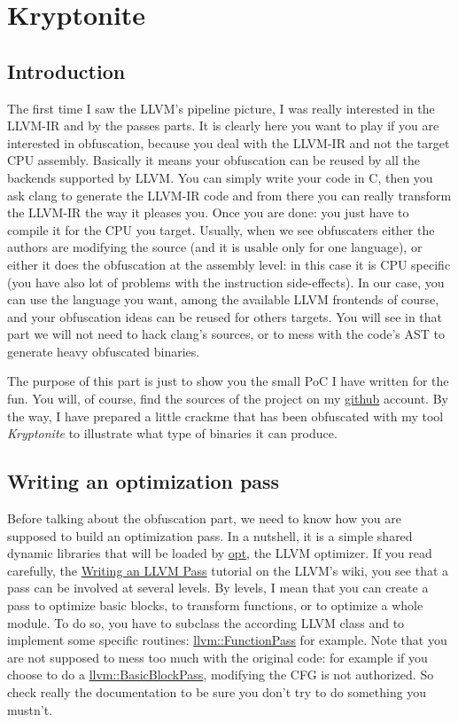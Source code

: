 \documentclass[a4paper, 11pt, notitlepage]{report}
\begin{document}
\newpage
\chapter{Kryptonite}
\section{Introduction}
The first time I saw the LLVM's pipeline picture, I was really interested in the LLVM-IR and by the passes parts. It is clearly here you want to play if you are interested in obfuscation, because you deal with the LLVM-IR and not the target CPU assembly. Basically it means your obfuscation can be reused by all the backends supported by LLVM. You can simply write your code in C, then you ask clang to generate the LLVM-IR code and from there you can really transform the LLVM-IR the way it pleases you. Once you are done: you just have to compile it for the CPU you target. Usually, when we see obfuscaters either the authors are modifying the source (and it is usable only for one language), or either it does the obfuscation at the assembly level: in this case it is CPU specific (you have also lot of problems with the instruction side-effects). In our case, you can use the language you want, among the available LLVM frontends of course, and your obfuscation ideas can be reused for others targets. You will see in that part we will not need to hack clang's sources, or to mess with the code's AST to generate heavy obfuscated binaries.

The purpose of this part is just to show you the small PoC I have written for the fun. You will, of course, find the sources of the project on my \href{https://github.com/0vercl0k/stuffz/tree/master/llvm-funz/kryptonite}{github} account. By the way, I have prepared a little crackme that has been obfuscated with my tool \textit{Kryptonite} to illustrate what type of binaries it can produce. 
\section{Writing an optimization pass}
Before talking about the obfuscation part, we need to know how you are supposed to build an optimization pass. In a nutshell, it is a simple shared dynamic libraries that will be loaded by \href{http://llvm.org/docs/CommandGuide/opt.html}{opt}, the LLVM optimizer. If you read carefully, the \href{http://llvm.org/docs/WritingAnLLVMPass.html}{Writing an LLVM Pass} tutorial on the LLVM's wiki, you see that a pass can be involved at several levels. By levels, I mean that you can create a pass to optimize basic blocks, to transform functions, or to optimize a whole module. To do so, you have to subclass the according LLVM class and to implement some specific routines: \href{https://llvm.org/viewvc/llvm-project/llvm/trunk/include/llvm/Pass.h?view=markup}{llvm::FunctionPass} for example. Note that you are not supposed to mess too much with the original code: for example if you choose to do a \href{https://llvm.org/viewvc/llvm-project/llvm/trunk/include/llvm/Pass.h?view=markup}{llvm::BasicBlockPass}, modifying the CFG is not authorized. So check really the documentation to be sure you don't try to do something you mustn't.
\end{document}
